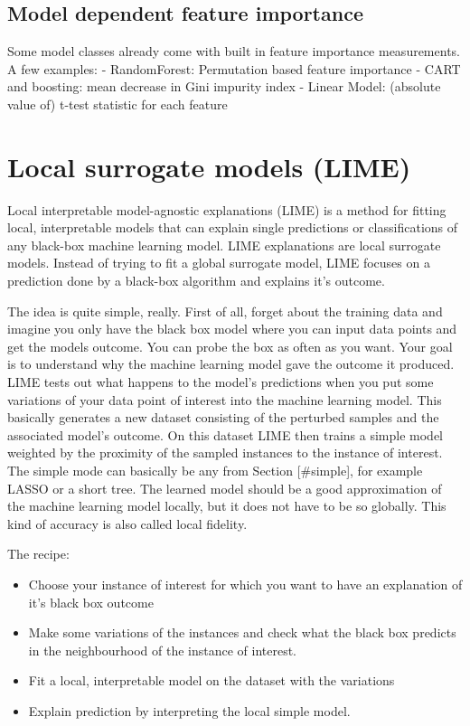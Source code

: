 \documentclass[12pt,]{krantz}
\providecommand{\tightlist}{%
  \setlength{\itemsep}{0pt}\setlength{\parskip}{0pt}}
\theoremstyle{definition}
\theoremstyle{definition}
\theoremstyle{definition}
\theoremstyle{remark}
\begin{document}
\subsection{Model dependent feature
importance}\label{model-dependent-feature-importance}

Some model classes already come with built in feature importance
measurements. A few examples: - RandomForest: Permutation based feature
importance - CART and boosting: mean decrease in Gini impurity index -
Linear Model: (absolute value of) t-test statistic for each feature

\section{Local surrogate models
(LIME)}\label{local-surrogate-models-lime}

Local interpretable model-agnostic explanations (LIME) is a method for
fitting local, interpretable models that can explain single predictions
or classifications of any black-box machine learning model. LIME
explanations are local surrogate models. Instead of trying to fit a
global surrogate model, LIME focuses on a prediction done by a black-box
algorithm and explains it's outcome.

The idea is quite simple, really. First of all, forget about the
training data and imagine you only have the black box model where you
can input data points and get the models outcome. You can probe the box
as often as you want. Your goal is to understand why the machine
learning model gave the outcome it produced. LIME tests out what happens
to the model's predictions when you put some variations of your data
point of interest into the machine learning model. This basically
generates a new dataset consisting of the perturbed samples and the
associated model's outcome. On this dataset LIME then trains a simple
model weighted by the proximity of the sampled instances to the instance
of interest. The simple mode can basically be any from Section
{[}\#simple{]}, for example LASSO or a short tree. The learned model
should be a good approximation of the machine learning model locally,
but it does not have to be so globally. This kind of accuracy is also
called local fidelity.

The recipe:

\begin{itemize}
\tightlist
\item
  Choose your instance of interest for which you want to have an
  explanation of it's black box outcome
\item
  Make some variations of the instances and check what the black box
  predicts in the neighbourhood of the instance of interest.
\item
  Fit a local, interpretable model on the dataset with the variations
\item
  Explain prediction by interpreting the local simple model.
\end{itemize}
\end{document}
